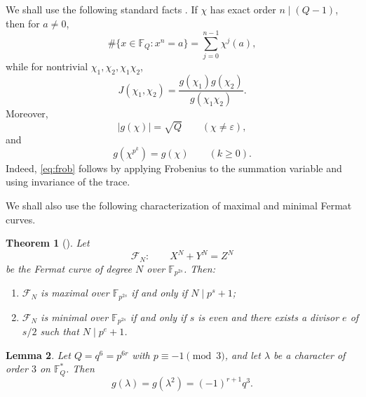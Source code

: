 \documentclass[3p,10pt]{elsarticle}
\newtheorem{theorem}{Theorem}[section]
\newtheorem{lemma}[theorem]{Lemma}
\theoremstyle{remark}
\newcommand{\F}{\mathbb{F}}
\begin{document}
We shall use the following standard facts \cite[Secs.~8.1, 8.3]{IrelandRosen}. If $\chi$ has exact order $n\mid(Q-1)$, then for $a\ne 0$,
\begin{equation}\label{eq:roots}
\#\{x\in\F_Q:x^n=a\}=\sum_{j=0}^{n-1}\chi^j(a),
\end{equation}
while for nontrivial $\chi_1,\chi_2,\chi_1\chi_2$,
\begin{equation}\label{eq:JG}
J(\chi_1,\chi_2)=\frac{g(\chi_1)g(\chi_2)}{g(\chi_1\chi_2)}.
\end{equation}
Moreover,
\[
|g(\chi)|=\sqrt Q\qquad(\chi\ne\varepsilon),
\]
and
\begin{equation}\label{eq:frob}
g(\chi^{p^k})=g(\chi)\qquad(k\ge 0).
\end{equation}
Indeed, \eqref{eq:frob} follows by applying Frobenius to the summation variable and using invariance of the trace.

We shall also use the following characterization of maximal and minimal Fermat curves.

\begin{theorem}[{\cite[Theorem~5]{minimalandmaximal}}]\label{thm:Fermat}
Let
\[
\mathcal F_N:\qquad X^N+Y^N=Z^N
\]
be the Fermat curve of degree $N$ over $\F_{p^{2s}}$. Then:
\begin{enumerate}
\item[\rm (i)] $\mathcal F_N$ is maximal over $\F_{p^{2s}}$ if and only if $N\mid p^s+1$;
\item[\rm (ii)] $\mathcal F_N$ is minimal over $\F_{p^{2s}}$ if and only if $s$ is even and there exists a divisor $e$ of $s/2$ such that $N\mid p^e+1$.
\end{enumerate}
\end{theorem}

\begin{lemma}\label{lem:cubic}
Let $Q=q^6=p^{6r}$ with $p\equiv -1\pmod 3$, and let $\lambda$ be a character of order $3$ on $\F_Q^*$. Then
\[
g(\lambda)=g(\lambda^2)=(-1)^{r+1}q^3.
\]
\end{lemma}
\end{document}

